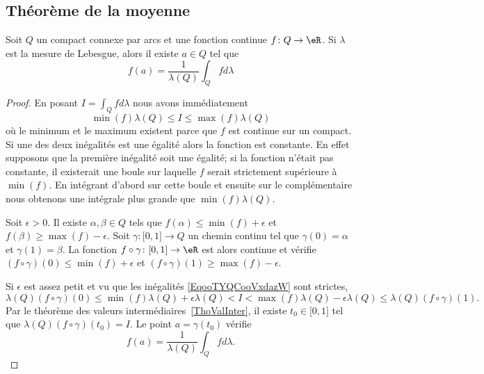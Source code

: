 \subsection{Théorème de la moyenne}

\begin{theorem}      \label{ThoooEZLGooMChwLT}
	Soit \( Q\) un compact connexe par arcs et une fonction continue \( f\colon Q\to \eR\). Si \( \lambda\) est la mesure de Lebesgue, alors il existe \( a\in Q\) tel que
	\begin{equation}
		f(a)=\frac{1}{ \lambda(Q) }\int_Qfd\lambda
	\end{equation}
\end{theorem}

\begin{proof}
	En posant \( I=\int_Qfd\lambda\) nous avons immédiatement
	\begin{equation}        \label{EqooTYQCooVxdazW}
		\min(f)\lambda(Q)\leq I\leq \max(f)\lambda(Q)
	\end{equation}
	où le minimum et le maximum existent parce que \( f\) est continue sur un compact. Si une des deux inégalités est une égalité alors la fonction est constante. En effet supposons que la première inégalité soit une égalité; si la fonction n'était pas constante, il existerait une boule sur laquelle \( f\) serait strictement supérieure à \( \min(f)\). En intégrant d'abord sur cette boule et ensuite sur le complémentaire nous obtenons une intégrale plus grande que \( \min(f)\lambda(Q)\).

	Soit \( \epsilon>0\). Il existe \( \alpha,\beta\in Q\) tels que \( f(\alpha)\leq\min(f)+\epsilon\) et \( f(\beta)\geq\max(f)-\epsilon\). Soit \( \gamma\colon \mathopen[ 0 , 1 \mathclose]\to Q\) un chemin continu tel que \( \gamma(0)=\alpha\) et \( \gamma(1)=\beta\). La fonction \( f\circ \gamma\colon \mathopen[ 0 , 1 \mathclose]\to \eR\) est alors continue et vérifie \( (f\circ\gamma)(0)\leq \min(f)+\epsilon\) et \( (f\circ\gamma)(1)\geq \max(f)-\epsilon\).

	Si \( \epsilon\) est assez petit et vu que les inégalités \eqref{EqooTYQCooVxdazW} sont strictes,
	\begin{equation}
		\lambda(Q)(f\circ\gamma)(0)\leq \min(f)\lambda(Q)+\epsilon\lambda(Q)<I<\max(f)\lambda(Q)-\epsilon\lambda(Q)\leq\lambda(Q)(f\circ \gamma)(1).
	\end{equation}
	Par le théorème des valeurs intermédiaires~\ref{ThoValInter}, il existe \( t_0\in\mathopen[ 0 , 1 \mathclose]\) tel que \( \lambda(Q)(f\circ\gamma)(t_0)=I\). Le point \( a=\gamma(t_0)\) vérifie
	\begin{equation}
		f(a)=\frac{1}{ \lambda(Q) }\int_Qfd\lambda.
	\end{equation}
\end{proof}

